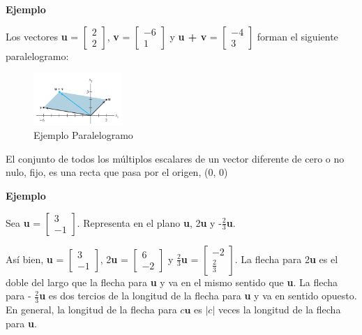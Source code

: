 \documentclass{article}
\begin{document}
\begin{large}
    \textbf{Ejemplo}
\end{large}

Los vectores \textbf{u} = $\begin{bmatrix} 2\\2 \end{bmatrix}$, \textbf{v} = $\begin{bmatrix} -6\\1 \end{bmatrix}$ y \textbf{u + v} = $\begin{bmatrix} -4\\3 \end{bmatrix}$ forman el siguiente paralelogramo:

\begin{figure}[ht]
    \centerline{\includegraphics[width=0.3\textwidth]{image8.png}}
    \caption{Ejemplo Paralelogramo}
    \label{}
\end{figure}

El conjunto de todos los múltiplos escalares de un vector diferente de cero o no nulo, fijo, es una recta que pasa por el origen, (0, 0)

\begin{large}
    \textbf{Ejemplo}
\end{large}

Sea \textbf{u} = $\begin{bmatrix} 3\\-1 \end{bmatrix}$. Representa en el plano \textbf{u}, 2\textbf{u} y -$\frac{2}{3}$\textbf{u}.

Así bien, \textbf{u} = $\begin{bmatrix} 3\\-1 \end{bmatrix}$, 2\textbf{u} = $\begin{bmatrix} 6\\-2 \end{bmatrix}$ y $\frac{2}{3}$\textbf{u} = $\begin{bmatrix} -2\\ \frac{2}{3} \end{bmatrix}$. La flecha para 2\textbf{u} es el doble del largo que la flecha para \textbf{u} y va en el mismo sentido que \textbf{u}. La flecha para - $\frac{2}{3}$\textbf{u} es dos tercios de la longitud de la flecha para \textbf{u} y va en sentido opuesto. En general, la longitud de la flecha para $c\textbf{u}$ es $|c|$ veces la longitud de la flecha para \textbf{u}. 
\end{document}
